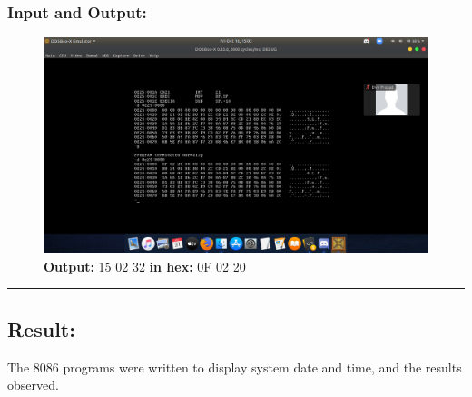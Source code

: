 \documentclass[10pt,a4paper]{article}
\begin{document}
\begin{flushleft}
\subsubsection*{\textbf{Input and Output:}}
\begin{figure}[h]
    \centering
    \includegraphics[trim = 100mm 60mm 100mm 150mm, clip, width = \textwidth]{Pics/TimeIO.png}
    \caption{\textbf{Output:} 15 02 32 \textbf{in hex:} 0F 02 20}
\end{figure}
\hrule
\subsection*{\textbf{Result:}}
The 8086 programs were written to display system date and time, and the results observed.
\end{flushleft}
\end{document}
